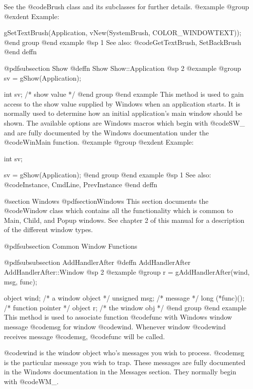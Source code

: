 See the @code{Brush} class and its subclasses for further details.
@example
@group
@exdent Example:

gSetTextBrush(Application, vNew(SystemBrush, COLOR_WINDOWTEXT));
@end group
@end example
@sp 1
See also:  @code{GetTextBrush, SetBackBrush}
@end deffn










@pdfsubsection {Show}
@deffn {Show} Show::Application
@sp 2
@example
@group
sv = gShow(Application);

int     sv;     /*  show value   */
@end group
@end example
This method is used to gain access to the show value supplied by Windows
when an application starts.  It is normally used to determine how an
initial application's main window should be shown.  The available
options are Windows macros which begin with @code{SW_} and are fully
documented by the Windows documentation under the @code{WinMain}
function.
@example
@group
@exdent Example:

int     sv;

sv = gShow(Application);
@end group
@end example
@sp 1
See also:  @code{Instance, CmdLine, PrevInstance}
@end deffn









@section Windows
@pdfsection{Windows}
This section documents the @code{Window} class which contains all the
functionality which is common to Main, Child, and Popup windows.  See
chapter 2 of this manual for a description of the different window
types.



@pdfsubsection {Common Window Functions}



@pdfsubsubsection {AddHandlerAfter}
@deffn {AddHandlerAfter} AddHandlerAfter::Window
@sp 2
@example
@group
r = gAddHandlerAfter(wind, msg, func);

object   wind;     /*  a window object  */
unsigned msg;      /*  message          */
long    (*func)(); /*  function pointer */
object  r;         /*  the window obj   */
@end group
@end example
This method is used to associate function @code{func} with Windows window
message @code{msg} for window @code{wind}.  Whenever window @code{wind}
receives message @code{msg}, @code{func} will be called.

@code{wind} is the window object who's messages you wish to process.
@code{msg} is the particular message you wish to trap.  These messages
are fully documented in the Windows documentation in the Messages
section.  They normally begin with @code{WM_}.

